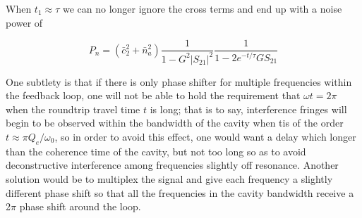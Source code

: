 \documentclass[aps,prl,twocolumn,groupedaddress]{revtex4-1}
\begin{document}
When $t_1 \approx \tau$ we can no longer ignore the cross terms and end up with a noise power of

\begin{equation}
P_n = (\bar{c}_2^2 + \bar{n}_a^2)\frac{1}{1 - G^2|S_{21}|^2}\frac{1}{1-2e^{-t/\tau}GS_{21}}
\end{equation}

One subtlety is that if there is only phase shifter for multiple frequencies within the feedback loop, one will not be able to hold the requirement that $\omega t = 2\pi$ when the roundtrip travel time $t$ is long; that is to say, interference fringes will begin to be observed within the bandwidth of the cavity when tis of the order $t \approx \pi Q_e / \omega_0$, so in order to avoid this effect, one would want a delay which longer than the coherence time of the cavity, but not too long so as to avoid deconstructive interference among frequencies slightly off resonance. Another solution would be to multiplex the signal and give each frequency a slightly different phase shift so that all the frequencies in the cavity bandwidth receive a 2$\pi$ phase shift around the loop.

\end{document}
